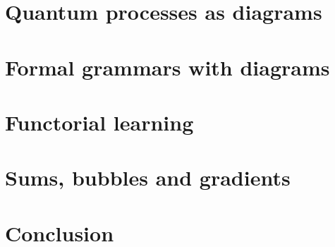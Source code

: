 \chapter{Quantum processes as diagrams}
\chapter{Formal grammars with diagrams}
\chapter{Functorial learning}
\chapter{Sums, bubbles and gradients}

\chapter*{Conclusion}


\setlength{\baselineskip}{0pt} %

{\renewcommand*\MakeUppercase[1]{#1}%
\printbibliography[heading=bibintoc,title={\bibtitle}]}


